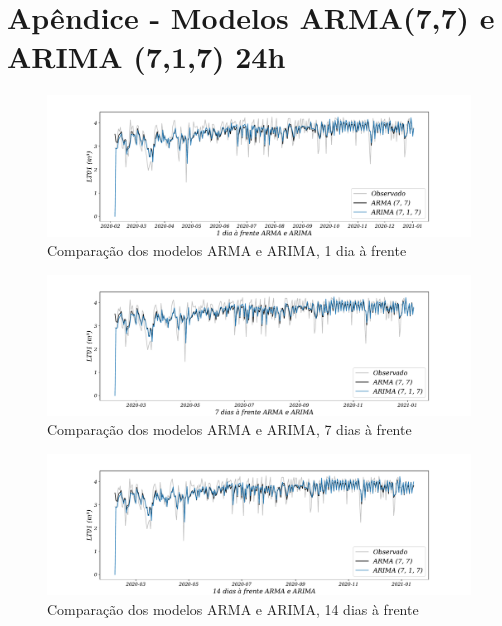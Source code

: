 
\section{Ap\^endice - Modelos ARMA(7,7) e ARIMA (7,1,7) 24h}\label{sec:armaarima24}

\begin{figure}[H]
	\centering
	\caption{Comparação dos modelos ARMA e ARIMA, 1 dia à frente }
	\label{fig:1-ARMA-ARIMA24}
	\includegraphics[width=1\linewidth]{Apendices/Figuras/modelagem-24h/1-ARMA-ARIMA}
	
\end{figure}

\begin{figure}[!htpb]
	\centering
	\caption{Comparação dos modelos ARMA e ARIMA, 7 dias à frente }
	\label{fig:10-ARMA-ARIMA24}
	\includegraphics[width=1\linewidth]{Apendices/Figuras/modelagem-24h/7-ARMA-ARIMA}
	
\end{figure}


\begin{figure}[!htpb]
	\centering
	\caption{Comparação dos modelos ARMA e ARIMA, 14 dias à frente }
	\label{fig:30-ARMA-ARIMA24}
	\includegraphics[width=1\linewidth]{Apendices/Figuras/modelagem-24h/14-ARMA-ARIMA}
\end{figure}

